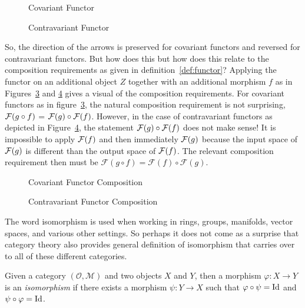\documentclass[../sean_thesis.tex]{subfiles}
\begin{document}
\begin{figure}
	
	\caption{Covariant Functor}
	\label{fig:covariantfunctor}
\end{figure}

\begin{figure}
	
	\caption{Contravariant Functor}
	\label{fig:contravariantfunctor}
\end{figure}

So, the direction of the arrows is preserved for covariant functors and reversed for contravariant functors. But how does this but how does this relate to the composition requirements as given in definition~\ref{def:functor}? Applying the functor on an additional object $Z$ together with an additional morphism $f$ as in Figures~\ref{fig:covariantfunctor_comp} and \ref{fig:contravariantfunctor_comp} gives a visual of the composition requirements. For covariant functors as in figure~\ref{fig:covariantfunctor_comp}, the natural composition requirement is not surprising, $\mathcal{F}(g \circ f)$ = $\mathcal{F}(g) \circ \mathcal{F}(f)$. However, in the case of contravariant functors as depicted in Figure~\ref{fig:contravariantfunctor_comp}, the statement $\mathcal{F}(g) \circ \mathcal{F}(f)$ does not make sense! It is impossible to apply $\mathcal{F}(f)$ and then immediately $\mathcal{F}(g)$ because the input space of $\mathcal{F}(g)$ is different than the output space of $\mathcal{F}(f)$. The relevant composition requirement then must be $\mathcal{F}(g\circ f) = \mathcal{F}(f) \circ \mathcal{F}(g)$.

\begin{figure}
	
	\caption{Covariant Functor Composition}
	\label{fig:covariantfunctor_comp}
\end{figure}

\begin{figure}
	
	\caption{Contravariant Functor Composition}
	\label{fig:contravariantfunctor_comp}
\end{figure}

The word isomorphism is used when working in rings, groups, manifolds, vector spaces, and various other settings. So perhaps it does not come as a surprise that category theory also provides general definition of isomorphism that carries over to all of these different categories.

\begin{definition}[Isomorphism]
	Given a category $(\mathcal{O},\mathcal{M})$ and two objects $X$ and $Y$, then a morphism $\varphi: X \to Y$ is an \emph{isomorphism} if there exists a morphism $\psi: Y \to X$ such that $\varphi \circ \psi = \operatorname{Id}$ and $\psi \circ \varphi = \operatorname{Id}$.
\end{definition}
\end{document}
